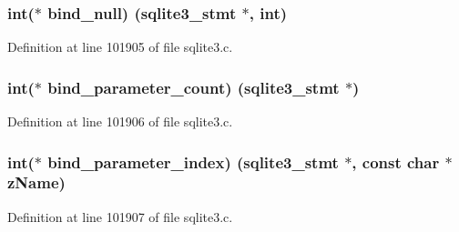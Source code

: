 \subsubsection[{bind\+\_\+null}]{\setlength{\rightskip}{0pt plus 5cm}int($\ast$ bind\+\_\+null) ({\bf sqlite3\+\_\+stmt} $\ast$, int)}\label{structsqlite3__api__routines_a2dd582c7cf3a0bb65c1f8da45700bbac}


Definition at line 101905 of file sqlite3.\+c.

\hypertarget{structsqlite3__api__routines_a7441ab05f379ac808cfad8d6005eed61}{}
\subsubsection[{bind\+\_\+parameter\+\_\+count}]{\setlength{\rightskip}{0pt plus 5cm}int($\ast$ bind\+\_\+parameter\+\_\+count) ({\bf sqlite3\+\_\+stmt} $\ast$)}\label{structsqlite3__api__routines_a7441ab05f379ac808cfad8d6005eed61}


Definition at line 101906 of file sqlite3.\+c.

\hypertarget{structsqlite3__api__routines_a43a564bb094d5b9a86304beb50f69430}{}
\subsubsection[{bind\+\_\+parameter\+\_\+index}]{\setlength{\rightskip}{0pt plus 5cm}int($\ast$ bind\+\_\+parameter\+\_\+index) ({\bf sqlite3\+\_\+stmt} $\ast$, const char $\ast$z\+Name)}\label{structsqlite3__api__routines_a43a564bb094d5b9a86304beb50f69430}


Definition at line 101907 of file sqlite3.\+c.

\hypertarget{structsqlite3__api__routines_a1680ea8ab78f3c1a459a4c56a91ca496}{}
